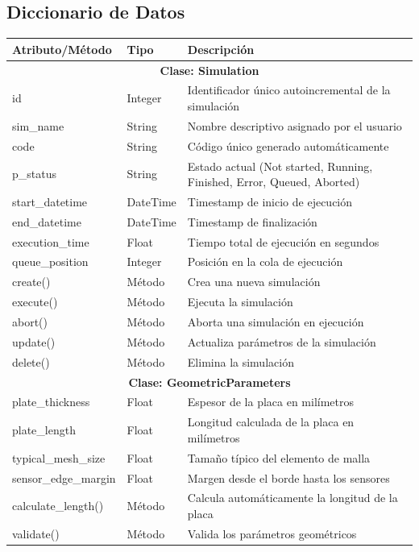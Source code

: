 \subsection{Diccionario de Datos}
\label{ssc:DD}

\small %
\begin{longtable}{|p{3cm}|p{2cm}|p{8cm}|}
\hline
\textbf{Atributo/Método} & \textbf{Tipo} & \textbf{Descripción} \\
\hline
\multicolumn{3}{|c|}{\textbf{Clase: Simulation}} \\
\hline
id & Integer & Identificador único autoincremental de la simulación \\
sim\_name & String & Nombre descriptivo asignado por el usuario \\
code & String & Código único generado automáticamente \\
p\_status & String & Estado actual (Not started, Running, Finished, Error, Queued, Aborted) \\
start\_datetime & DateTime & Timestamp de inicio de ejecución \\
end\_datetime & DateTime & Timestamp de finalización \\
execution\_time & Float & Tiempo total de ejecución en segundos \\
queue\_position & Integer & Posición en la cola de ejecución \\
create() & Método & Crea una nueva simulación \\
execute() & Método & Ejecuta la simulación \\
abort() & Método & Aborta una simulación en ejecución \\
update() & Método & Actualiza parámetros de la simulación \\
delete() & Método & Elimina la simulación \\
\hline
\multicolumn{3}{|c|}{\textbf{Clase: GeometricParameters}} \\
\hline
plate\_thickness & Float & Espesor de la placa en milímetros \\
plate\_length & Float & Longitud calculada de la placa en milímetros \\
typical\_mesh\_size & Float & Tamaño típico del elemento de malla \\
sensor\_edge\_margin & Float & Margen desde el borde hasta los sensores \\
calculate\_length() & Método & Calcula automáticamente la longitud de la placa \\
validate() & Método & Valida los parámetros geométricos \\

\end{longtable}
